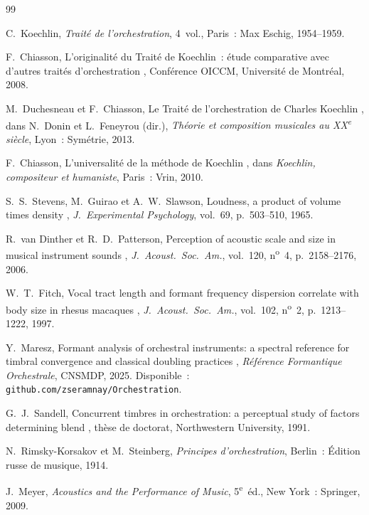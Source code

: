\documentclass[journal]{IEEEtran}
\begin{document}
\begin{thebibliography}{99}

C.~Koechlin, \textit{Traité de l'orchestration}, 4~vol., Paris~: Max Eschig, 1954--1959.

F.~Chiasson, \og L'originalité du Traité de Koechlin~: étude comparative avec d'autres traités d'orchestration \fg, Conférence OICCM, Université de Montréal, 2008.

M.~Duchesneau et F.~Chiasson, \og Le Traité de l'orchestration de Charles Koechlin \fg, dans N.~Donin et L.~Feneyrou (dir.), \textit{Théorie et composition musicales au XX\textsuperscript{e} siècle}, Lyon~: Symétrie, 2013.

F.~Chiasson, \og L'universalité de la méthode de Koechlin \fg, dans \textit{Koechlin, compositeur et humaniste}, Paris~: Vrin, 2010.

S.~S.~Stevens, M.~Guirao et A.~W.~Slawson, \og Loudness, a product of volume times density \fg, \textit{J.~Experimental Psychology}, vol.~69, p.~503--510, 1965.

R.~van Dinther et R.~D.~Patterson, \og Perception of acoustic scale and size in musical instrument sounds \fg, \textit{J.~Acoust.~Soc.~Am.}, vol.~120, n\textsuperscript{o}~4, p.~2158--2176, 2006.

W.~T.~Fitch, \og Vocal tract length and formant frequency dispersion correlate with body size in rhesus macaques \fg, \textit{J.~Acoust.~Soc.~Am.}, vol.~102, n\textsuperscript{o}~2, p.~1213--1222, 1997.

Y.~Maresz, \og Formant analysis of orchestral instruments: a spectral reference for timbral convergence and classical doubling practices \fg, \textit{Référence Formantique Orchestrale}, CNSMDP, 2025. Disponible~: \texttt{github.com/zseramnay/Orchestration}.

G.~J.~Sandell, \og Concurrent timbres in orchestration: a perceptual study of factors determining blend \fg, thèse de doctorat, Northwestern University, 1991.

N.~Rimsky-Korsakov et M.~Steinberg, \textit{Principes d'orchestration}, Berlin~: Édition russe de musique, 1914.

J.~Meyer, \textit{Acoustics and the Performance of Music}, 5\textsuperscript{e}~éd., New York~: Springer, 2009.

\end{thebibliography}
\end{document}
